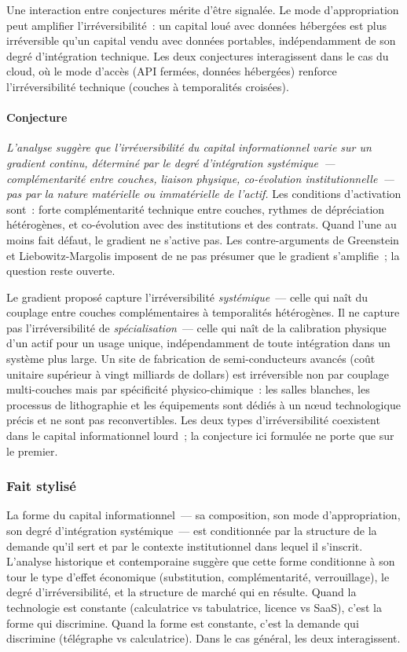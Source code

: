 Une interaction entre conjectures mérite d'être signalée. Le mode d'appropriation peut amplifier l'irréversibilité~: un capital loué avec données hébergées est plus irréversible qu'un capital vendu avec données portables, indépendamment de son degré d'intégration technique. Les deux conjectures interagissent dans le cas du cloud, où le mode d'accès (API fermées, données hébergées) renforce l'irréversibilité technique (couches à temporalités croisées).

\paragraph{Conjecture} \emph{L'analyse suggère que l'irréversibilité du capital informationnel varie sur un gradient continu, déterminé par le degré d'intégration systémique~--- complémentarité entre couches, liaison physique, co-évolution institutionnelle~--- pas par la nature matérielle ou immatérielle de l'actif.} Les conditions d'activation sont~: forte complémentarité technique entre couches, rythmes de dépréciation hétérogènes, et co-évolution avec des institutions et des contrats. Quand l'une au moins fait défaut, le gradient ne s'active pas. Les contre-arguments de Greenstein et Liebowitz-Margolis imposent de ne pas présumer que le gradient s'amplifie~; la question reste ouverte.

Le gradient proposé capture l'irréversibilité \emph{systémique}~--- celle qui naît du couplage entre couches complémentaires à temporalités hétérogènes. Il ne capture pas l'irréversibilité de \emph{spécialisation}~--- celle qui naît de la calibration physique d'un actif pour un usage unique, indépendamment de toute intégration dans un système plus large. Un site de fabrication de semi-conducteurs avancés (coût unitaire supérieur à vingt milliards de dollars) est irréversible non par couplage multi-couches mais par spécificité physico-chimique~: les salles blanches, les processus de lithographie et les équipements sont dédiés à un n\oe ud technologique précis et ne sont pas reconvertibles. Les deux types d'irréversibilité coexistent dans le capital informationnel lourd~; la conjecture ici formulée ne porte que sur le premier.


\subsubsection{Fait stylisé}

La forme du capital informationnel~--- sa composition, son mode d'appropriation, son degré d'intégration systémique~--- est conditionnée par la structure de la demande qu'il sert et par le contexte institutionnel dans lequel il s'inscrit. L'analyse historique et contemporaine suggère que cette forme conditionne à son tour le type d'effet économique (substitution, complémentarité, verrouillage), le degré d'irréversibilité, et la structure de marché qui en résulte. Quand la technologie est constante (calculatrice vs tabulatrice, licence vs SaaS), c'est la forme qui discrimine. Quand la forme est constante, c'est la demande qui discrimine (télégraphe vs calculatrice). Dans le cas général, les deux interagissent.

